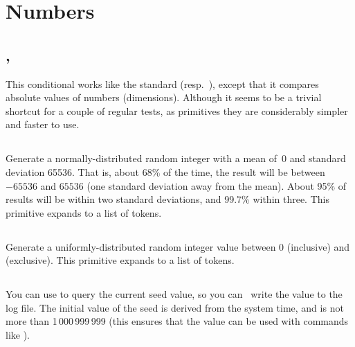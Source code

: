\documentclass{pdftexmanual}
\begin{document}
\section{Numbers}

\subsection{, }

This conditional works like the standard  (resp.\ ),
except that it compares absolute values of numbers (dimensions).
Although it seems to be a trivial shortcut for a couple of regular
 tests, as primitives they are considerably simpler and faster to
use. 

\subsection{}

Generate a normally-distributed random integer with a mean of~0 and
standard deviation 65536. That is, about 68\% of the time, the result
will be between $-65536$ and $65536$ (one standard deviation away from
the mean). About 95\% of results will be within two standard deviations,
and 99.7\% within three. This primitive expands to a list of tokens.

\subsection{}

Generate a uniformly-distributed random integer value between 0
(inclusive) and  (exclusive). This primitive expands
to a list of tokens. 

\subsection{}

You can use  to query the current seed value, so you
can \eg\ write the value to the log file. The initial value of the seed
is derived from the system time, and is not more than 1\,000\,999\,999
(this ensures that the value can be used with commands like ).
\end{document}
